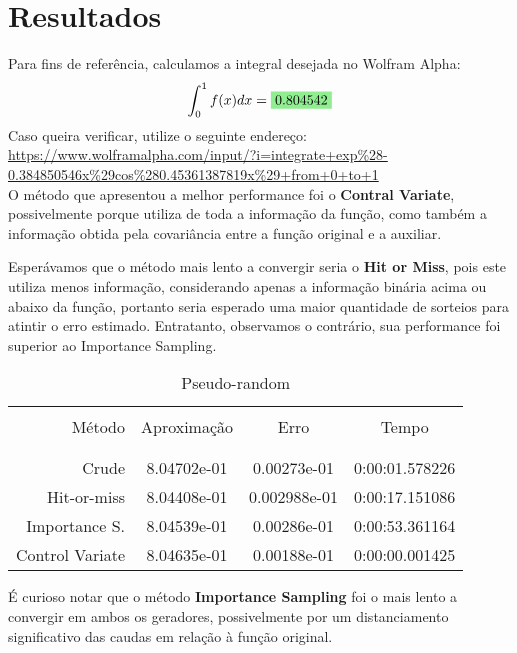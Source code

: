 \documentclass[twocolumn,amsmath,amssymb,floatfix]{revtex4}
\newcommand{\highlight}[1]{\colorbox{mygreen}{$\displaystyle #1$}}
\begin{document}
\newpage

\section{Resultados} 

Para fins de referência, calculamos a integral desejada no Wolfram Alpha:
\begin{equation}
    \int_0^1 f(x)dx = \highlight{0.804542}
\end{equation}
Caso queira verificar, utilize o seguinte endereço:\\
\url{https://www.wolframalpha.com/input/?i=integrate+exp%28-0.384850546x%29cos%280.45361387819x%29+from+0+to+1}
\\

O método que apresentou a melhor performance foi o \textbf{Contral Variate}, possivelmente porque utiliza de toda a informação da função, como também a informação obtida pela covariância entre a função original e a auxiliar.

Esperávamos que o método mais lento a convergir seria o \textbf{Hit or Miss}, pois este utiliza menos informação, considerando apenas a informação binária acima ou abaixo da função, portanto seria esperado uma maior quantidade de sorteios para atintir o erro estimado. Entratanto, observamos o contrário, sua performance foi superior ao Importance Sampling.

\begin{table}[h!]
\centering
\caption{Pseudo-random}
\begin{tabular}{rccc}\hline\hline\\
 Método & Aproximação & Erro & Tempo\\\\
	\hline\hline
	\\
  Crude &  8.04702e-01 & 0.00273e-01 & 0:00:01.578226 \\
  Hit-or-miss &  8.04408e-01 & 0.002988e-01 &  0:00:17.151086 \\
  Importance S. &  8.04539e-01 & 0.00286e-01 &  0:00:53.361164 \\
  Control Variate &  8.04635e-01 & 0.00188e-01 & 0:00:00.001425\\
		\hline\hline
\end{tabular}
\label{tabpseudoresults}
\end{table}

É curioso notar que o método \textbf{Importance Sampling} foi o mais lento a convergir em ambos os geradores, possivelmente por um distanciamento significativo das caudas em relação à função original.
\end{document}
